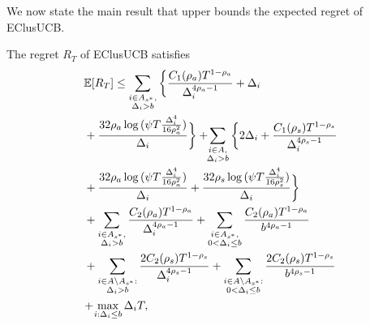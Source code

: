 	
We now state the main result that upper bounds the expected regret of EClusUCB.
\begin{theorem}
\label{Result:Theorem:1}
The regret $R_T$ of EClusUCB satisfies
\begin{align*}
&\mathbb{E} [R_{T}]\leq 
\sum\limits_{\substack{i\in A_{s^{*}},\\\Delta_{i} > b}}\bigg\lbrace \frac{C_1(\rho_{a})T^{1-\rho_{a}}}{\Delta_{i}^{4\rho_{a}-1}} + \Delta_{i}\\
& + \frac{32\rho_{a}\log{(\psi T\frac{\Delta_{i}^{4}}{16\rho_{a}^{2}})}}{\Delta_{i}} \bigg\rbrace
 + \! \! \sum\limits_{\substack{i\in A,\\\Delta_{i} > b}} \bigg\lbrace 2\Delta_{i}+
\frac{C_1(\rho_{s})T^{1-\rho_{s}}}{\Delta_{i}^{4\rho_{s}-1}} \\
&+ \frac{32\rho_{a}\log{(\psi T\frac{\Delta_{i}^{4}}{16\rho_{a}^{2}})}}{\Delta_{i}} 
+ \frac{32\rho_{s}\log{(\psi T\frac{\Delta_{i}^{4}}{16\rho_{s}^{2}})}}{\Delta_{i}}\bigg\rbrace \\
&+ \sum\limits_{\substack{i\in A_{s^{*}},\\ \Delta_{i} > b}} 
\frac{C_2(\rho_{a})T^{1-\rho_{a}}}{\Delta_{i}^{4\rho_{a}-1}}
+\sum\limits_{\substack{i\in A_{s^{*}},\\0 < \Delta_{i}\leq b}}\frac{C_2(\rho_a)T^{1-\rho_{a}}}{b^{4\rho_{a} -1}}\\ 
&+ \sum_{\substack{i\in A\setminus A_{s^*}:\\\Delta_{i}> b}}\frac{2C_{2}(\rho_{s})T^{1-\rho_{s}}}{\Delta_{i}^{4\rho_{s}-1}} +\sum_{\substack{i\in A \setminus A_{s^*}:\\ 0 < \Delta_{i} \leq b}}\frac{2C_{2}(\rho_{s})T^{1-\rho_{s}}}{b^{4\rho_{s}-1}}\\
& \!+\! \max\limits_{i:\Delta_{i}\leq b}\Delta_{i}T, 
\end{align*}

\end{theorem}
